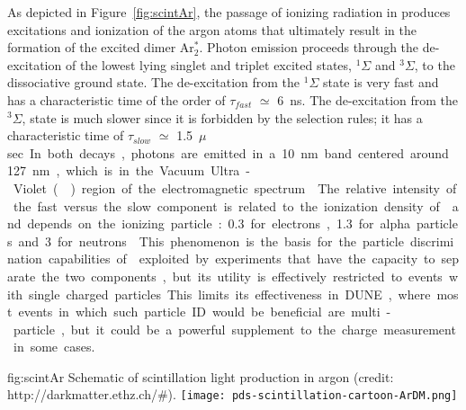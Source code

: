 As depicted in Figure~\ref{fig:scintAr}, the passage of ionizing radiation in \lar produces excitations and ionization of the argon atoms that ultimately result in the formation of the excited dimer Ar$^*_2$.  
Photon emission proceeds through the de-excitation of the lowest lying singlet and triplet excited states, $^{1}\Sigma$ and 
$^{3}\Sigma$, to the dissociative ground state. The de-excitation from the $^{1}\Sigma$ state is very fast and has a characteristic time of the order of $\tau_{fast}$ $\simeq$ \SI{6}{ns}. The de-excitation from the $^{3}\Sigma$, state is much slower since it is forbidden by the selection rules; it has a characteristic time of $\tau_{slow}$ $\simeq$ \SI{1.5}{$\mu$sec}. %
In both decays, photons are emitted in a \SI{10}{nm} band centered around \SI{127}{nm}, which is in the Vacuum Ultra-Violet () region of the electromagnetic spectrum~\cite{Heindl:2010zz}.
The relative intensity of the  fast %
versus the slow component is related to the ionization density of \lar and depends on the ionizing particle: \num{0.3} for electrons, \num{1.3} for alpha particles and \num{3} for neutrons~\cite{PhysRevB.27.5279}. 
This phenomenon is the basis for the particle discrimination capabilities of \lar exploited by experiments that have the capacity to separate the two components, but its utility is effectively restricted to events with single charged particles. This %
limits its effectiveness in DUNE, where most events in which such particle ID would be beneficial are multi-particle, but %
it could be a powerful supplement to the charge measurement in some cases.

\begin{dunefigure}{fig:scintAr}
{Schematic of scintillation light production in argon (credit: http://darkmatter.ethz.ch/\#).}
\texttt{[image: pds-scintillation-cartoon-ArDM.png]}
\end{dunefigure}



